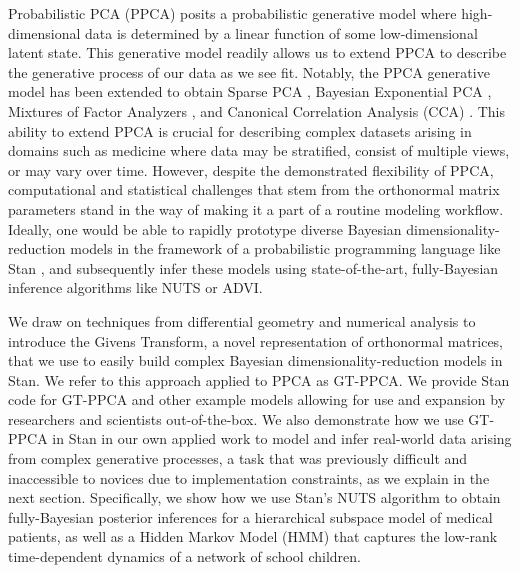 \documentclass{article}
\begin{document}
Probabilistic PCA (PPCA) \citep{tipping1999probabilistic} posits a probabilistic generative model where high-dimensional data is determined by a linear function of some low-dimensional latent state. This generative model readily allows us to extend PPCA to describe the generative process of our data as we see fit. Notably, the PPCA generative model has been extended to obtain Sparse PCA \citep{hoff2009simulation}, Bayesian Exponential PCA \citep{mohamed2009bayesian}, Mixtures of Factor Analyzers \citep{ghahramani1996algorithm}, and Canonical Correlation Analysis (CCA) \citep[chapt.~12.5]{murphy2012machine}. This ability to extend PPCA is crucial for describing complex datasets arising in domains such as medicine where data may be stratified, consist of multiple views, or may vary over time. However, despite the demonstrated flexibility of PPCA, computational and statistical challenges that stem from the orthonormal matrix parameters stand in the way of making it a part of a routine modeling workflow. Ideally, one would be able to rapidly prototype diverse Bayesian dimensionality-reduction models in the framework of a probabilistic programming language like Stan \citep{carpenter2016stan}, and subsequently infer these models using state-of-the-art, fully-Bayesian inference algorithms like NUTS or ADVI. 

We draw on techniques from differential geometry and numerical analysis to introduce the Givens Transform, a novel representation of orthonormal matrices, that we use to easily build complex Bayesian dimensionality-reduction models in Stan. We refer to this approach applied to PPCA as GT-PPCA. We provide Stan code for GT-PPCA and other example models allowing for use and expansion by researchers and scientists out-of-the-box. We also demonstrate how we use GT-PPCA in Stan in our own applied work to model and infer real-world data arising from complex generative processes, a task that was previously difficult and inaccessible to novices due to implementation constraints, as we explain in the next section. Specifically, we show how we use Stan's NUTS algorithm to obtain fully-Bayesian posterior inferences for a hierarchical subspace model of medical patients, as well as a Hidden Markov Model (HMM) that captures the low-rank time-dependent dynamics of a network of school children.
\end{document}

